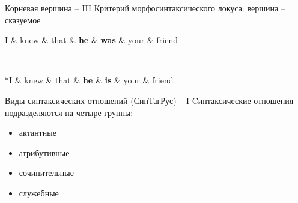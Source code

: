\documentclass{beamer}
\begin{document}
\begin{frame}{Корневая вершина -- III}
Критерий морфосинтаксического локуса: вершина -- сказуемое\\
\smallskip
\begin{center}
\begin{dependency}[theme = simple]
   \begin{deptext}[column sep=1em]
      I \& knew \& that \& \textbf{he} \& \textbf{was} \& your \& friend \\
   \end{deptext}
\end{dependency}
\\
\begin{dependency}[theme = simple]
   \begin{deptext}[column sep=1em]
      *I \& knew \& that \& \textbf{he} \& \textbf{is} \& your \& friend \\
   \end{deptext}
\end{dependency}
\end{center}
\end{frame}

\begin{frame}{Виды синтаксических отношений (СинТагРус) -- I}
Cинтаксические отношения подразделяются на четыре группы:\\
\medskip
\begin{itemize}
    \item актантные 
    \item атрибутивные
    \item сочинительные
    \item служебные
\end{itemize}
\end{frame}
\end{document}
